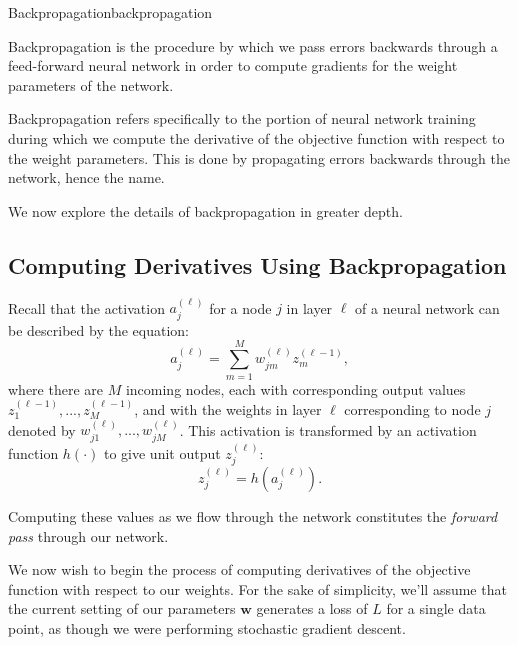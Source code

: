 \begin{definition}{Backpropagation}{backpropagation}
  
Backpropagation is the procedure by which we pass errors backwards through a feed-forward neural network in order to compute gradients for the weight parameters of the network.
\end{definition}

Backpropagation refers specifically to the portion of neural network training during which we compute the derivative of the objective function with respect to the weight parameters. This is done by propagating errors backwards through the network, hence the name.


We now explore the details of backpropagation in greater depth.

\subsection{Computing Derivatives Using Backpropagation}

Recall that the activation $a_{j}^{(\ell)}$ for a  node $j$ in layer $\ell$ of a neural network can be described by the equation:
\begin{equation} \label{activations-reminder}
	a_{j}^{(\ell)} = \sum_{m=1}^{M} w^{(\ell)}_{jm} z^{(\ell-1)}_{m},
      \end{equation}
where there are $M$ incoming nodes, each with corresponding output values $z^{(\ell-1)}_{1}, ..., z^{(\ell-1)}_{M}$, and with the weights in layer $\ell$ corresponding to node $j$ denoted by $w^{(\ell)}_{j1}, ..., w^{(\ell)}_{jM}$.
This activation is transformed by an activation function $h(\cdot)$  to give unit output $z^{(\ell)}_{j}$:
\begin{equation} \label{transformed-activations-reminder}
	z^{(\ell)}_{j} = h(a^{(\ell)}_{j}).
\end{equation}

Computing these values as we flow through the network constitutes the {\em forward pass } through our network.

We now wish to begin the process of computing derivatives of the objective function with respect to our weights. For the sake of simplicity, we'll assume that the current setting of our parameters $\textbf{w}$ generates a loss of $L$ for a single data point, as though we were performing stochastic gradient descent.

